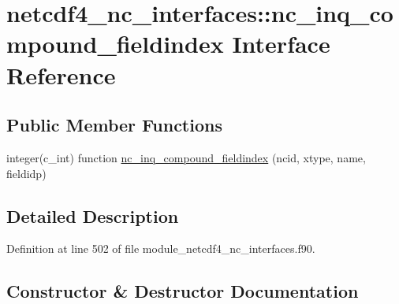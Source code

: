\hypertarget{interfacenetcdf4__nc__interfaces_1_1nc__inq__compound__fieldindex}{}\section{netcdf4\+\_\+nc\+\_\+interfaces\+:\+:nc\+\_\+inq\+\_\+compound\+\_\+fieldindex Interface Reference}
\label{interfacenetcdf4__nc__interfaces_1_1nc__inq__compound__fieldindex}
\subsection*{Public Member Functions}
\begin{DoxyCompactItemize}
\item 
integer(c\+\_\+int) function \hyperlink{interfacenetcdf4__nc__interfaces_1_1nc__inq__compound__fieldindex_aad0aaf7d5980bccd4428103c01644136}{nc\+\_\+inq\+\_\+compound\+\_\+fieldindex} (ncid, xtype, name, fieldidp)
\end{DoxyCompactItemize}


\subsection{Detailed Description}


Definition at line 502 of file module\+\_\+netcdf4\+\_\+nc\+\_\+interfaces.\+f90.



\subsection{Constructor \& Destructor Documentation}
\mbox{\label{interfacenetcdf4__nc__interfaces_1_1nc__inq__compound__fieldindex_aad0aaf7d5980bccd4428103c01644136}} 
